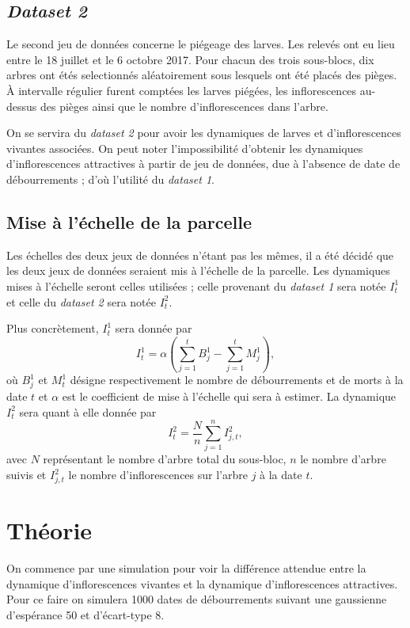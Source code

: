 \documentclass[a4paper, 11pt]{article}
\begin{document}
\subsection{\textit{Dataset 2}}

Le second jeu de données concerne le piégeage des larves. Les relevés ont eu lieu entre le 18 juillet et le 6 octobre 2017. Pour chacun des trois sous-blocs, dix arbres ont étés selectionnés aléatoirement sous lesquels ont été placés des pièges. À intervalle régulier furent comptées les larves piégées, les inflorescences au-dessus des pièges ainsi que le nombre d'inflorescences dans l'arbre.

On se servira du \textit{dataset 2} pour avoir les dynamiques de larves et d'inflorescences vivantes associées. On peut noter l'impossibilité d'obtenir les dynamiques d'inflorescences attractives à partir de jeu de données, due à l'absence de date de débourrements ; d'où l'utilité du \textit{dataset 1}.

\subsection{Mise à l'échelle de la parcelle}

Les échelles des deux jeux de données n'étant pas les mêmes, il a été décidé que les deux jeux de données seraient mis à l'échelle de la parcelle. Les dynamiques mises à l'échelle seront celles utilisées ; celle provenant du \textit{dataset 1} sera notée $I_t^1$ et celle du \textit{dataset 2} sera notée $I_t^2$.

Plus concrètement, $I_t^1$ sera donnée par
$$I_t^1 = \alpha\left( \sum_{j=1}^t B_j^1 - \sum_{j=1}^t M_j^1 \right),$$
où $B_j^1$ et $M_t^1$ désigne respectivement le nombre de débourrements et de morts à la date $t$ et $\alpha$ est le coefficient de mise à l'échelle qui sera à estimer. La dynamique $I_t^2$ sera quant à elle donnée par
$$I_t^2 = \frac{N}{n}\sum_{j=1}^n I_{j, t}^2,$$
avec $N$ représentant le nombre d'arbre total du sous-bloc, $n$ le nombre d'arbre suivis et $I_{j, t}^2$ le nombre d'inflorescences sur l'arbre $j$ à la date $t$.

\section{Théorie}

On commence par une simulation pour voir la différence attendue entre la dynamique d'inflorescences vivantes et la dynamique d'inflorescences attractives. Pour ce faire on simulera 1000 dates de débourrements suivant une gaussienne d'espérance 50 et d'écart-type 8.
\end{document}
